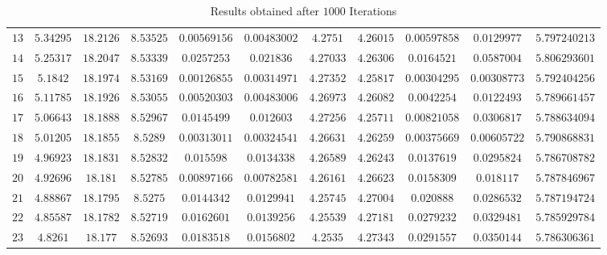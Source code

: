 \begin{landscape}
\begin{table}[ht]
\begin{tabular}{ c  c  c  c  c  c  c  c  c  c  c}
    $13$ & $5.34295$ & $18.2126$ & $8.53525$ & $0.00569156$ & $0.00483002$ &  $4.2751$ & $4.26015$ & $0.00597858$ &  $0.0129977$ & $5.797240213$ \\
    $14$ & $5.25317$ & $18.2047$ & $8.53339$ &  $0.0257253$ &   $0.021836$ & $4.27033$ & $4.26306$ &  $0.0164521$ &  $0.0587004$ & $5.806293601$ \\
    $15$ &  $5.1842$ & $18.1974$ & $8.53169$ & $0.00126855$ & $0.00314971$ & $4.27352$ & $4.25817$ & $0.00304295$ & $0.00308773$ & $5.792404256$ \\
    $16$ & $5.11785$ & $18.1926$ & $8.53055$ & $0.00520303$ & $0.00483006$ & $4.26973$ & $4.26082$ &  $0.0042254$ &  $0.0122493$ & $5.789661457$ \\
    $17$ & $5.06643$ & $18.1888$ & $8.52967$ &  $0.0145499$ &   $0.012603$ & $4.27256$ & $4.25711$ & $0.00821058$ &  $0.0306817$ & $5.788634094$ \\
    $18$ & $5.01205$ & $18.1855$ &  $8.5289$ & $0.00313011$ & $0.00324541$ & $4.26631$ & $4.26259$ & $0.00375669$ & $0.00605722$ & $5.790868831$ \\
    $19$ & $4.96923$ & $18.1831$ & $8.52832$ &   $0.015598$ &  $0.0134338$ & $4.26589$ & $4.26243$ &  $0.0137619$ &  $0.0295824$ & $5.786708782$ \\
    $20$ & $4.92696$ &  $18.181$ & $8.52785$ & $0.00897166$ & $0.00782581$ & $4.26161$ & $4.26623$ &  $0.0158309$ &   $0.018117$ & $5.787846967$ \\
    $21$ & $4.88867$ & $18.1795$ &  $8.5275$ &  $0.0144342$ &  $0.0129941$ & $4.25745$ & $4.27004$ &   $0.020888$ &  $0.0286532$ & $5.787194724$ \\
    $22$ & $4.85587$ & $18.1782$ & $8.52719$ &  $0.0162601$ &  $0.0139256$ & $4.25539$ & $4.27181$ &  $0.0279232$ &  $0.0329481$ & $5.785929784$ \\
    $23$ &  $4.8261$ &  $18.177$ & $8.52693$ &  $0.0183518$ &  $0.0156802$ &  $4.2535$ & $4.27343$ &  $0.0291557$ &  $0.0350144$ & $5.786306361$ \\[1ex]
    \bottomrule
  \end{tabular}
  \caption{Results obtained after $1000$ Iterations}
\end{table}
\end{landscape}


